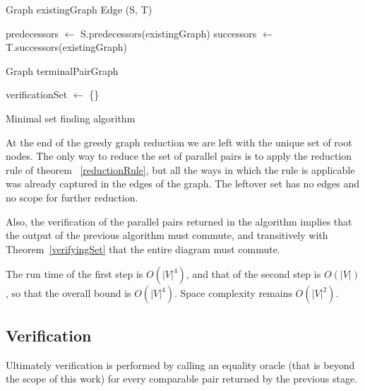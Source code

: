\documentclass[sigplan,review]{acmart}
\begin{document}
{\begin{algorithm}
\DontPrintSemicolon
{}
Graph existingGraph\;
Edge (S, T)\;
        
predecessors $\gets$ S.predecessors(existingGraph)\;
successors $\gets$ T.successors(existingGraph)\;

Graph terminalPairGraph\;

verificationSet $\gets$ \{\}\;
\;
\caption{Minimal set finding algorithm}
\label{algo_online_minimal}
\end{algorithm}

At the end of the greedy graph reduction we are left with the unique set of root nodes.
The only way to reduce the set of parallel pairs is to apply the reduction rule of theorem ~\ref{reductionRule}, but all the ways in which the rule is applicable was already captured in the edges of the graph. The leftover set has no edges and no scope for further reduction.

Also, the verification of the parallel pairs returned in the algorithm implies that the output of the previous algorithm must commute, and transitively with Theorem~\ref{verifyingSet} that the entire diagram must commute.

The run time of the first step is $O(|V|^4)$, and that of the second step is $O(|V|)$, so that the overall bound is $O(|V|^4)$.
Space complexity remains $O(|V|^2)$.

\subsection{Verification}
Ultimately verification is performed by calling an equality oracle (that is beyond the scope of this work) for every comparable pair returned by the previous stage.

}
\end{document}

